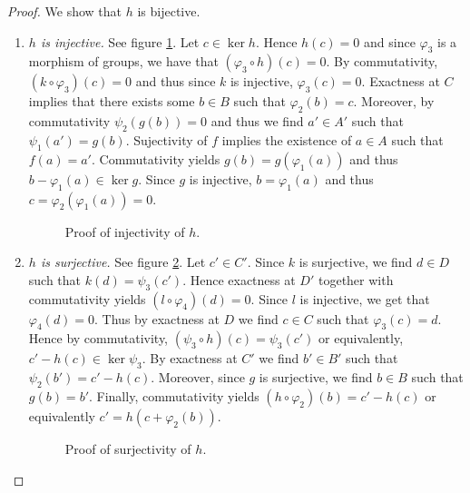 \begin{proof} 
	We show that $h$ is bijective.
	\begin{enumerate}[label = \textit{Step \arabic*:}, wide = 0pt]
		\item \textit{$h$ is injective.} See figure \ref{fig:h_injective}. Let $c \in \ker h$. Hence $h(c) = 0$ and since $\varphi_3$ is a morphism of groups, we have that $(\varphi_3 \circ h)(c) = 0$. By commutativity, $(k \circ \varphi_3)(c) = 0$ and thus since $k$ is injective, $\varphi_3(c) = 0$. Exactness at $C$ implies that there exists some $b \in B$ such that $\varphi_2(b) = c$. Moreover, by commutativity $\psi_2(g(b)) = 0$ and thus we find $a' \in A'$ such that $\psi_1(a') = g(b)$. Sujectivity of $f$ implies the existence of $a \in A$ such that $f(a) = a'$. Commutativity yields $g(b) = g(\varphi_1(a))$ and thus $b - \varphi_1(a) \in \ker g$. Since $g$ is injective, $b = \varphi_1(a)$ and thus $c = \varphi_2(\varphi_1(a)) = 0$.  
			\begin{figure}[h!tb]
				\centering
				\caption{Proof of injectivity of $h$.}
				\label{fig:h_injective}
			\end{figure}

		\item \textit{$h$ is surjective.} See figure \ref{fig:h_surjective}. Let $c' \in C'$. Since $k$ is surjective, we find $d \in D$ such that $k(d) = \psi_3(c')$. Hence exactness at $D'$ together with commutativity yields $(l \circ \varphi_4)(d) = 0$. Since $l$ is injective, we get that $\varphi_4(d) = 0$. Thus by exactness at $D$ we find $c \in C$ such that $\varphi_3(c) = d$. Hence by commutativity, $(\psi_3 \circ h)(c) = \psi_3(c')$ or equivalently, $c' - h(c) \in \ker \psi_3$. By exactness at $C'$ we find $b' \in B'$ such that $\psi_2(b') = c' - h(c)$. Moreover, since $g$ is surjective, we find $b \in B$ such that $g(b) = b'$. Finally, commutativity yields $(h \circ \varphi_2)(b) = c' - h(c)$ or equivalently $c' = h(c + \varphi_2(b))$.
			\begin{figure}[h!tb]
				\centering
				\caption{Proof of surjectivity of $h$.}
				\label{fig:h_surjective}
			\end{figure}
	\end{enumerate}
\end{proof}

